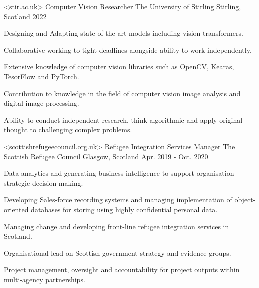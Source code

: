 

\begin{cventries}

  \cventry
    {\href{https://www.stir.ac.uk}{<stir.ac.uk>}\vspace{-5pt} \newline Computer Vision Researcher} %
    {The University of Stirling\vspace{-9pt}} %
    {Stirling, Scotland} %
    {2022} %
    {
      \begin{cvitems} %
        \item {Designing and Adapting state of the art models including vision transformers.}
        \item {Collaborative working to tight deadlines alongside ability to work independently.}
        \item {Extensive knowledge of computer vision libraries such as OpenCV, Kearas, TesorFlow and PyTorch.}
        \item {Contribution to knowledge in the field of computer vision image analysis and digital image processing.}
        \item {Ability to conduct independent research, think algorithmic and apply original thought to challenging complex problems.}
      \end{cvitems}
    }

  \cventry
    {\href{https://www.scottishrefugeecouncil.org.uk/}{<scottishrefugeecouncil.org.uk>}\vspace{-5pt} \newline Refugee Integration Services Manager } %
    {The Scottish Refugee Council\vspace{-9pt}} %
    {Glasgow, Scotland} %
    {Apr. 2019 - Oct. 2020} %
    {
      \begin{cvitems} %
        \item {Data analytics and generating business intelligence to support organisation strategic decision making.}
        \item {Developing Sales-force recording systems and managing implementation of object-oriented databases for storing using highly confidential personal data.}
        \item {Managing change and developing front-line refugee integration services in Scotland. }
        \item {Organisational lead on Scottish government strategy and evidence groups. }
        \item {Project management, oversight and accountability for project outputs within multi-agency partnerships. }
      \end{cvitems}
    }


\end{cventries}
